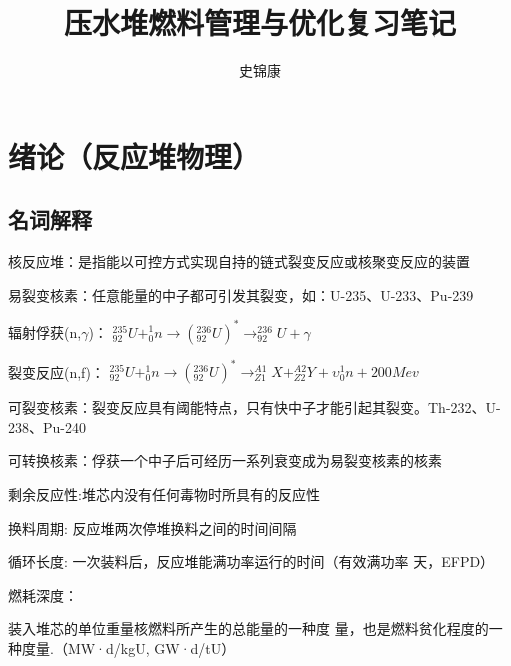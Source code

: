 \documentclass[openany]{ctexart}
\numberwithin{equation}{section} %
\begin{document}
\title{\heiti 压水堆燃料管理与优化复习笔记}

\author{史锦康}

\date{\zhtoday}

\maketitle


\newpage
%


\section{绪论（反应堆物理）}
\subsection{名词解释}

核反应堆：是指能以可控方式实现自持的链式裂变反应或核聚变反应的装置

易裂变核素：任意能量的中子都可引发其裂变，如：U-235、U-233、Pu-239

辐射俘获(n,$\gamma$)：
$ _{92}^{235}U +_{0}^{1}n \longrightarrow  (_{92}^{236}U)^{*} \longrightarrow  _{92}^{236}U+\gamma$

裂变反应(n,f)： 
$ _{92}^{235}U +_{0}^{1}n \longrightarrow  (_{92}^{236}U)^{*} \longrightarrow  _{Z1}^{A1}X +  _{Z2}^{A2}Y  + \upsilon_{0}^{1}n +200Mev $

可裂变核素：裂变反应具有阈能特点，只有快中子才能引起其裂变。Th-232、U-238、Pu-240

可转换核素：俘获一个中子后可经历一系列衰变成为易裂变核素的核素

剩余反应性:堆芯内没有任何毒物时所具有的反应性

换料周期: 反应堆两次停堆换料之间的时间间隔

循环长度: 一次装料后，反应堆能满功率运行的时间（有效满功率
天，EFPD）


燃耗深度： \hspace{0.11111em}
\begin{minipage}[t]{\linewidth}
	装入堆芯的单位重量核燃料所产生的总能量的一种度
量，也是燃料贫化程度的一种度量.\newline（MW·d/kgU, GW·d/tU）
\end{minipage}
\vspace{0.05ex}
\end{document}
